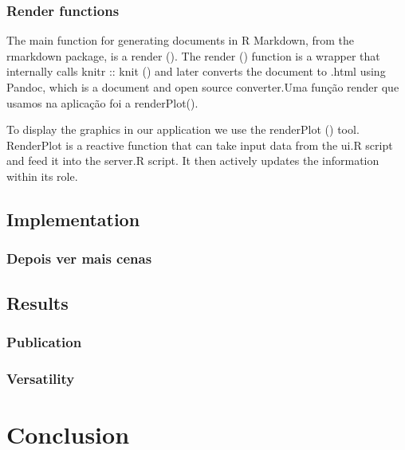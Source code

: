 \documentclass[11pt,a4paper]{report}
\begin{document}
\subsection{Render functions}

The main function for generating documents in R Markdown, from the rmarkdown package, is a render ().
The render () function is a wrapper that internally calls knitr :: knit () and later converts the document to .html using Pandoc, which is a document and open source converter.Uma função render que usamos na aplicação foi a renderPlot().

To display the graphics in our application we use the renderPlot () tool. RenderPlot is a reactive function that can take input data from the ui.R script and feed it into the server.R script. It then actively updates the information within its role.





\section{Implementation}
\subsection{Depois ver mais cenas}
\section{Results}
\subsection{Publication}
\subsection{Versatility}

\chapter{Conclusion}
\end{document}
